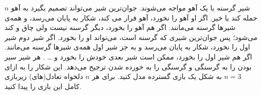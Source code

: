 $n$
شیر گرسنه با یک آهو مواجه می‌شوند. جوان‌ترین شیر می‌تواند تصمیم بگیرد به آهو حمله کند یا خیر. اگر او آهو را نخورد، آهو فرار می کند، شکار به پایان می‌رسد، و همه‌ی شیرها گرسنه می‌مانند. اگر هم آهو را بخورد، دیگر گرسنه نیست ولی چاق و کند می‌شود؛ پس جوان‌ترین شیری که گرسنه است، می‌تواند او را بخورد. اگر شیر دوم شیر اول را نخورد، شکار به پایان می‌رسد و به جز شیر اول همه‌ی شیرها گرسنه می‌مانند. اگر هم شیر اول را بخورد، ممکن است شیر بعدی خودش را بخورد و … . هر شیر سیر بودن را به گرسنگی و گرسنگی را به خورده شدن ترجیح می‌دهد. این شکار را به ازای
$n = 3$
به شکل یک بازی گسترده مدل کنید. برای هر
$n$
دلخواه تعادل(های) زیربازی کامل این بازی را پیدا کنید.
